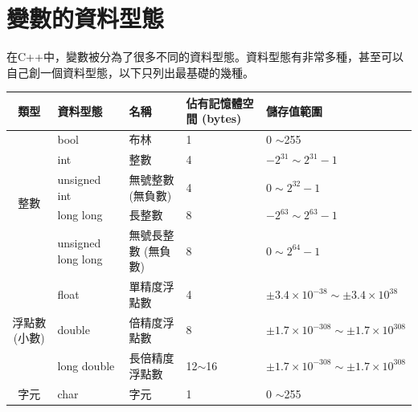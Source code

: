 \documentclass[a4paper, 11pt, oneside]{book}
\begin{document}
\section{變數的資料型態}
在C++中，變數被分為了很多不同的資料型態。資料型態有非常多種，甚至可以自己創一個資料型態，以下只列出最基礎的幾種。

\begin{table}[H]
\begin{tabularx}{\linewidth}{|c|X|X|X|X|}
\hline
類型                        & 資料型態               & 名稱          & 佔有記憶體空間 (bytes) & 儲存值範圍                                                 \\ \hline
\multirow{5}{*}{整數}       & bool               & 布林          & 1               & 0 $\sim$255                                           \\ \cline{2-5} 
                          & int                & 整數          & 4               & $-2^{31} \sim 2^{31} - 1$ \\ \cline{2-5} 
                          & unsigned int       & 無號整數 (無負數)  & 4               & $0 \sim 2^{32} - 1$                     \\ \cline{2-5} 
                          & long long          & 長整數         & 8               & $-2^{63} \sim 2^{63} - 1$ \\ \cline{2-5} 
                          & unsigned long long & 無號長整數 (無負數) & 8               &  $0 \sim 2^{64} - 1$                      \\ \hline
\multirow{3}{*}{浮點數 (小數)} & float              & 單精度浮點數      & 4               & $\pm 3.4 \times 10^{-38} \sim \pm 3.4 \times 10^{38}$                                                   \\ \cline{2-5} 
                          & double             & 倍精度浮點數      & 8               & $\pm 1.7 \times 10^{-308} \sim \pm 1.7 \times 10^{308}$                                                                                                     \\ \cline{2-5} 
                          & long double        & 長倍精度浮點數     & 12$\sim$16      & $\pm 1.7 \times 10^{-308} \sim \pm 1.7 \times 10^{308}$ \\ \hline
字元                        & char               & 字元          & 1               & 0 $\sim$255                                           \\ \hline
\end{tabularx}
\end{table}
\end{document}
